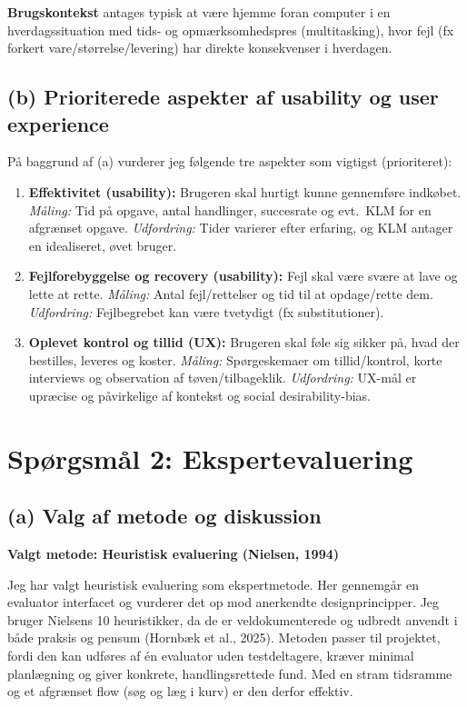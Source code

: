\documentclass[12pt,a4paper]{article}
\begin{document}
\textbf{Brugskontekst} antages typisk at være hjemme foran computer i en hverdagssituation med
tids- og opmærksomhedspres (multitasking), hvor fejl (fx forkert vare/størrelse/levering) har
direkte konsekvenser i hverdagen.

\subsection*{(b) Prioriterede aspekter af usability og user experience}
På baggrund af (a) vurderer jeg følgende tre aspekter som vigtigst (prioriteret):

\begin{enumerate}[leftmargin=*,itemsep=0.2em]
\item \textbf{Effektivitet (usability):} Brugeren skal hurtigt kunne gennemføre indkøbet.
\textit{Måling:} Tid på opgave, antal handlinger, succesrate og evt.\ KLM for en afgrænset opgave.
\textit{Udfordring:} Tider varierer efter erfaring, og KLM antager en idealiseret, øvet bruger.

\item \textbf{Fejlforebyggelse og recovery (usability):} Fejl skal være svære at lave og lette at rette.
\textit{Måling:} Antal fejl/rettelser og tid til at opdage/rette dem.
\textit{Udfordring:} Fejlbegrebet kan være tvetydigt (fx substitutioner).

\item \textbf{Oplevet kontrol og tillid (UX):} Brugeren skal føle sig sikker på, hvad der bestilles, leveres og koster.
\textit{Måling:} Spørgeskemaer om tillid/kontrol, korte interviews og observation af tøven/tilbageklik.
\textit{Udfordring:} UX-mål er upræcise og påvirkelige af kontekst og social desirability-bias.
\end{enumerate}


\newpage
\section*{Spørgsmål 2: Ekspertevaluering}

\subsection*{(a) Valg af metode og diskussion}

\textbf{Valgt metode: Heuristisk evaluering (Nielsen, 1994)}

Jeg har valgt heuristisk evaluering som ekspertmetode. Her gennemgår en evaluator interfacet og vurderer det op mod anerkendte designprincipper. Jeg bruger Nielsens 10 heuristikker, da de er veldokumenterede og udbredt anvendt i både praksis og pensum (Hornbæk et al., 2025). Metoden passer til projektet, fordi den kan udføres af én evaluator uden testdeltagere, kræver minimal planlægning og giver konkrete, handlingsrettede fund. Med en stram tidsramme og et afgrænset flow (søg og læg i kurv) er den derfor effektiv.
\end{document}
